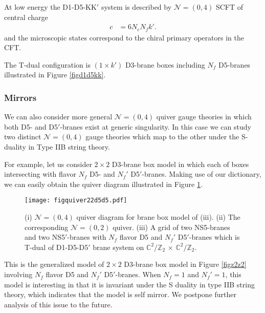 \documentclass{article}
\numberwithin{equation}{section}
\begin{document}
At low energy the D1-D5-KK$'$ system 
is described by $\mathcal{N}=(0,4)$ SCFT of central charge \cite{Bena:2005ay}
\begin{align}
\label{cc_d1d4kk}
c&=6N_{c} N_{f} k'. 
\end{align}
and the microscopic states correspond to the chiral primary operators in the CFT. 


The T-dual configuration is $(1\times k')$ D3-brane boxes including $N_{f}$ D5-branes illustrated in Figure \ref{figd1d5kk}. 





\subsubsection{Mirrors}
\label{sec_selfmirror}
We can also consider more general $\mathcal{N}=(0,4)$ quiver gauge theories 
in which both D5- and D5$'$-branes exist at generic singularity. 
In this case we can study two distinct $\mathcal{N}=(0,4)$ gauge theories 
which map to the other under the S-duality in Type IIB string theory. 

For example, let us consider $2\times 2$ D3-brane box model in 
which each of boxes intersecting with flavor $N_{f}$ D5- and $N_{f}'$ D5$'$-branes. 
Making use of our dictionary, we can easily obtain the quiver diagram illustrated in Figure \ref{figquiver22d5d5}. 
\begin{figure}
\begin{center}
\texttt{[image: figquiver22d5d5.pdf]}
\caption{(i) 
$\mathcal{N}=(0,4)$ quiver diagram for brane box model of (iii).
(ii) The corresponding $\mathcal{N}=(0,2)$ quiver. 
(iii) A grid of two NS5-branes and two NS5$'$-branes with $N_{f}$ flavor D5 and $N_{f}'$ D5$'$-branes 
which is T-dual of D1-D5-D5$'$ brane system on $\mathbb{C}^{2}/\mathbb{Z}_{2}$ $\times$ $\mathbb{C}^{2}/\mathbb{Z}_{2}$. }
\label{figquiver22d5d5}
\end{center}
\end{figure}
This is the generalized model of $2\times 2$ D3-brane box model in Figure \ref{figz2z2} 
involving $N_{f}$ flavor D5 and $N_{f}'$ D5$'$-branes. 
When $N_{f}=1$ and $N_{f}'=1$, 
this model is interesting in that 
it is invariant under the S duality in type IIB string theory, 
which indicates that the model is self mirror. 
We postpone further analysis of this issue to the future. 
\end{document}

